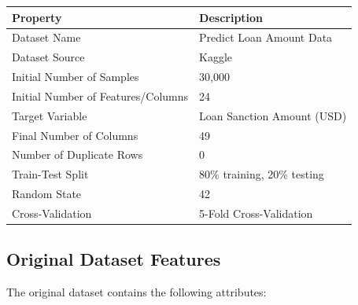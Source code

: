 \documentclass[12pt,a4paper]{article}
\begin{document}
\begin{longtable}{|p{6cm}|p{8cm}|}
\hline
\textbf{Property} & \textbf{Description} \\ \hline

Dataset Name &
Predict Loan Amount Data \\ \hline

Dataset Source &
Kaggle \\ \hline

Initial Number of Samples &
30,000 \\ \hline

Initial Number of Features/Columns &
24 \\ \hline

Target Variable &
Loan Sanction Amount (USD) \\ \hline

Final Number of Columns &
49 \\ \hline

Number of Duplicate Rows &
0 \\ \hline

Train-Test Split &
80\% training, 20\% testing \\ \hline

Random State &
42 \\ \hline

Cross-Validation &
5-Fold Cross-Validation \\ \hline

\end{longtable}

\subsection{Original Dataset Features}

The original dataset contains the following attributes:
\end{document}

